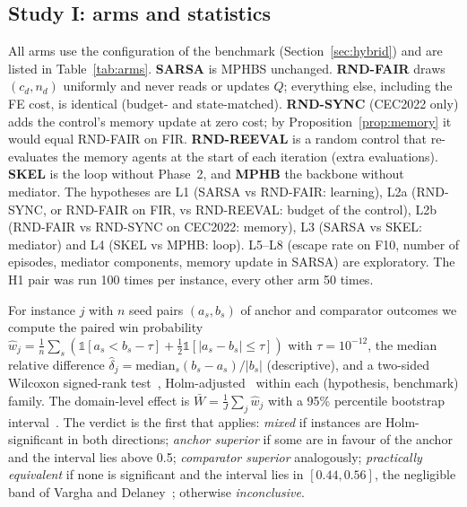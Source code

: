 \subsection{Study I: arms and statistics}
\label{sec:armsI}
All arms use the configuration of the benchmark (Section~\ref{sec:hybrid}) and are listed in Table~\ref{tab:arms}.
\textbf{SARSA} is MPHBS unchanged. \textbf{RND-FAIR} draws $(c_d,n_d)$ uniformly and never reads or updates $Q$; everything
else, including the FE cost, is identical (budget- and state-matched). \textbf{RND-SYNC} (CEC2022 only) adds the control's
memory update at zero cost; by Proposition~\ref{prop:memory} it would equal RND-FAIR on FIR. \textbf{RND-REEVAL} is a random control that
re-evaluates the memory agents at the start of each iteration (extra evaluations). \textbf{SKEL} is the loop without
Phase~2, and \textbf{MPHB} the backbone without mediator. The hypotheses are L1 (SARSA vs RND-FAIR: learning), L2a (RND-SYNC, or RND-FAIR on FIR,
vs RND-REEVAL: budget of the control), L2b (RND-FAIR vs RND-SYNC on CEC2022: memory), L3 (SARSA vs SKEL: mediator) and L4
(SKEL vs MPHB: loop). L5--L8 (escape rate on F10, number of episodes, mediator components, memory update in SARSA) are
exploratory. The H1 pair was run 100 times per instance, every other arm 50 times.



For instance $j$ with $n$ seed pairs $(a_s,b_s)$ of anchor and comparator outcomes we compute the paired win probability
$\hat w_j=\frac1n\sum_s(\mathbb 1[a_s<b_s-\tau]+\frac12\mathbb 1[|a_s-b_s|\le\tau])$ with $\tau=10^{-12}$, the median relative
difference $\hat\delta_j=\mathrm{median}_s(b_s-a_s)/|b_s|$ (descriptive), and a two-sided Wilcoxon signed-rank
test~\citep{wilcoxon1945}, Holm-adjusted~\citep{holm1979} within each (hypothesis, benchmark) family. The domain-level effect
is $\bar W=\frac1J\sum_j\hat w_j$ with a 95\% percentile bootstrap interval~\citep{efron1979bootstrap}. The verdict is the
first that applies: \emph{mixed} if instances are Holm-significant in both directions; \emph{anchor superior} if some are in
favour of the anchor and the interval lies above 0.5; \emph{comparator superior} analogously; \emph{practically equivalent} if
none is significant and the interval lies in $[0.44,0.56]$, the negligible band of Vargha and Delaney~\citep{vargha2000};
otherwise \emph{inconclusive}.


